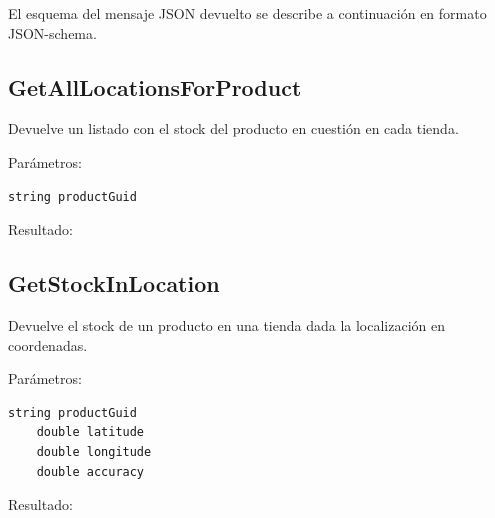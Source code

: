 El esquema del mensaje JSON devuelto se describe a continuación en formato JSON-schema.



\subsection{GetAllLocationsForProduct}
Devuelve un listado con el stock del producto en cuestión en cada tienda.

Parámetros:
\begin{lstlisting}[language=csh]
	string productGuid
\end{lstlisting}


Resultado:


\subsection{GetStockInLocation}
Devuelve el stock de un producto en una tienda dada la localización en coordenadas.

Parámetros:
\begin{lstlisting}[language=csh]
	string productGuid
	double latitude
	double longitude
	double accuracy
\end{lstlisting}

Resultado:


\chapterend